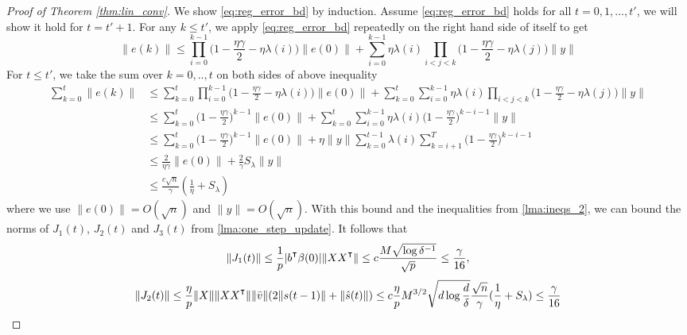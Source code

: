 \begin{proof}[Proof of Theorem \ref{thm:lin_conv}]
We show \eqref{eq:reg_error_bd} by induction. Assume \eqref{eq:reg_error_bd} holds for all $t=0,1,...,t'$, we will show it hold for $t=t'+1$. For any $k\leq t'$, we apply \eqref{eq:reg_error_bd} repeatedly on the right hand side of itself to get
\begin{equation*}
    \|e(k)\|\leq \prod_{i=0}^{k-1}\Big(1-\frac{\eta\gamma}{2}-\eta\lambda(i)\Big)\|e(0)\| + \sum_{i=0}^{k-1}\eta\lambda(i)\prod_{i<j<k}\Big(1-\frac{\eta\gamma}{2}-\eta\lambda(j)\Big)\|y\|
\end{equation*}
For $t\leq t'$, we take the sum over $k=0,..,t$ on both sides of above inequality
\begin{equation*}
\begin{aligned}
    \sum_{k=0}^{t}\|e(k)\|
    &\leq \sum_{k=0}^{t}\prod_{i=0}^{k-1}\Big(1-\frac{\eta\gamma}{2}-\eta\lambda(i)\Big)\|e(0)\|  + \sum_{k=0}^{t}\sum_{i=0}^{k-1}\eta\lambda(i)\prod_{i<j<k}\Big(1-\frac{\eta\gamma}{2}-\eta\lambda(j)\Big)\|y\| \\
    &\leq \sum_{k=0}^{t}\Big(1-\frac{\eta\gamma}{2}\Big)^{k-1}\|e(0)\|+ \sum_{k=0}^{t}\sum_{i=0}^{k-1}\eta\lambda(i)\Big(1-\frac{\eta\gamma}{2}\Big)^{k-i-1}\|y\| \\
    &\leq \sum_{k=0}^{t}\Big(1-\frac{\eta\gamma}{2}\Big)^{k-1}\|e(0)\| + \eta\|y\|\sum_{k=0}^{t-1}\lambda(i)\sum_{k=i+1}^T\Big(1-\frac{\eta\gamma}{2}\Big)^{k-i-1} \\
    &\leq \frac{2}{\eta\gamma}\|e(0)\|+ \frac{2}{\gamma}S_\lambda\|y\| \\
    &\leq \frac{c\sqrt n}{\gamma}(\frac{1}{\eta}+S_\lambda)
\end{aligned}
\end{equation*}
where we use $\|e(0)\|=O(\sqrt n)$ and $\|y\|=O(\sqrt n)$. With this bound and the inequalities from \cref{lma:ineqs_2}, we can bound the norms of $J_1(t)$, $J_2(t)$ and $J_3(t)$ from \cref{lma:one_step_update}. It follows that
\begin{equation}
\label{eq:J1_bd}
\|J_1(t)\| \leq \frac{1}{p}|b\transpose\beta(0)|\|XX\transpose\|\leq c\frac{M\sqrt{\log \delta^{-1}}}{\sqrt p}\leq \frac{\gamma}{16},
\end{equation}
\begin{equation}
\label{eq:J2_bd}
\|J_2(t)\| \leq \frac{\eta}{p}\|X\| \|XX\transpose\|\|\bar{v}\|(2\|s(t-1)\|+\|\hat{s}(t)\|)\leq c\frac{\eta}{p}M^{3/2}\sqrt{d\log\frac{d}{\delta}}\frac{\sqrt n}{\gamma}(\frac{1}{\eta}+S_\lambda)\leq \frac{\gamma}{16}
\end{equation}

\end{proof}
